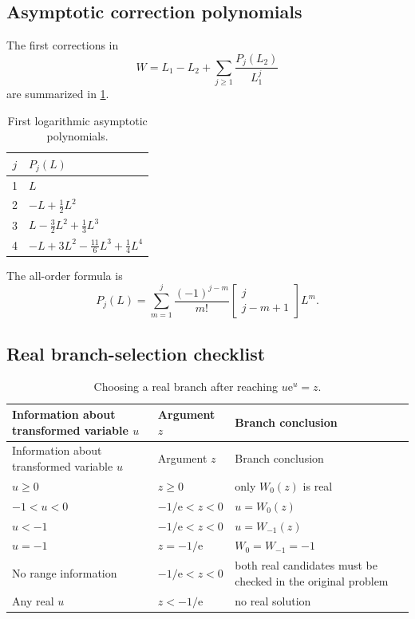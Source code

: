 \documentclass[11pt]{article}
\numberwithin{equation}{section}
\theoremstyle{definition}
\theoremstyle{remark}
\newcommand{\e}{\mathrm e}
\newcommand{\stirlingone}[2]{\left[\begin{matrix}#1\\#2\end{matrix}\right]}
\begin{document}
\subsection{Asymptotic correction polynomials}

The first corrections in
\[
 W=L_1-L_2+\sum_{j\ge1}\frac{P_j(L_2)}{L_1^j}
\]
are summarized in \cref{tab:asymptotic-polynomials}.

\begin{table}[htbp]
\centering
\caption{First logarithmic asymptotic polynomials.}
\label{tab:asymptotic-polynomials}
\begin{tabularx}{0.92\textwidth}{@{}cX@{}}
\toprule
$j$ & $P_j(L)$ \\
\midrule
1 & $L$ \\
2 & $-L+\frac12L^2$ \\
3 & $L-\frac32L^2+\frac13L^3$ \\
4 & $-L+3L^2-\frac{11}{6}L^3+\frac14L^4$ \\
\bottomrule
\end{tabularx}
\end{table}

The all-order formula is
\[
 P_j(L)=\sum_{m=1}^{j}\frac{(-1)^{j-m}}{m!}
 \stirlingone{j}{j-m+1}L^m.
\]

\subsection{Real branch-selection checklist}

\begin{longtable}{@{}p{}p{}p{}@{}}
\caption{Choosing a real branch after reaching $u\e^u=z$.}
\label{tab:branch-checklist}\\
\toprule
Information about transformed variable $u$ & Argument $z$ & Branch conclusion \\
\midrule
\endfirsthead
\toprule
Information about transformed variable $u$ & Argument $z$ & Branch conclusion \\
\midrule
\endhead
$u\ge0$ & $z\ge0$ & only $W_0(z)$ is real \\
$-1<u<0$ & $-1/\e<z<0$ & $u=W_0(z)$ \\
$u<-1$ & $-1/\e<z<0$ & $u=W_{-1}(z)$ \\
$u=-1$ & $z=-1/\e$ & $W_0=W_{-1}=-1$ \\
No range information & $-1/\e<z<0$ & both real candidates must be checked in the original problem \\
Any real $u$ & $z<-1/\e$ & no real solution \\
\bottomrule
\end{longtable}
\end{document}
